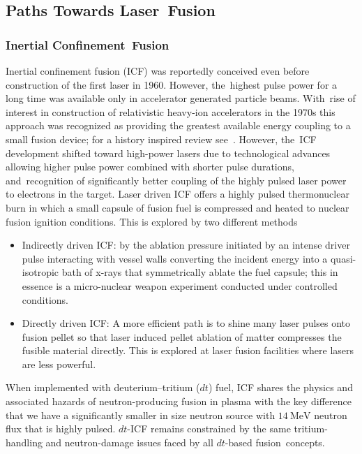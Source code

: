 \documentclass[particles,article,accept,pdftex,moreauthors]{Definitions/mdpi}
\newcommand*{\xblue}{}
\begin{document}
 
\subsection{Paths Towards Laser~Fusion}\label{ssec:INTlaserFusion}
\subsubsection{Inertial Confinement~Fusion}\label{sssec:picoICF}
Inertial confinement fusion (ICF) was {\xblue reportedly conceived even before construction of the first laser in 1960. However, the~highest pulse power for a long time was available only in accelerator generated particle beams. With~rise of interest in construction of relativistic heavy-ion accelerators in the 1970s this approach was recognized as providing the greatest available energy coupling to a small fusion device; for a history inspired review see~\cite{hofmann2018review}. However, the~ICF development shifted toward high-power lasers due to technological advances allowing higher pulse power combined with shorter pulse durations, and~recognition of significantly better coupling of the highly pulsed laser power to electrons in the target. Laser driven} ICF offers a highly pulsed thermonuclear burn in which a small capsule of fusion fuel is compressed and heated to nuclear fusion ignition conditions. This is explored by two different methods~\cite{Hurricane:2023Review}
\begin{itemize}
\item 
Indirectly driven ICF: by the ablation pressure initiated by an intense driver pulse interacting with vessel walls converting the incident energy into a quasi-isotropic bath of x-rays that symmetrically ablate the fuel capsule; this in essence is a micro-nuclear weapon experiment conducted under controlled conditions.
\item 
Directly driven ICF: A more efficient path is to shine many laser pulses onto fusion pellet so that laser induced pellet ablation of matter compresses the fusible material directly. This is explored at laser fusion facilities where lasers are less powerful.
\end{itemize}

When implemented with deuterium--tritium ($dt$) fuel, ICF shares the physics and associated hazards of neutron-producing fusion in plasma with the key difference that we have a significantly smaller in size neutron source with $14~\mathrm{MeV}$ neutron flux that is highly pulsed. $dt$-ICF remains constrained by the same tritium-handling and neutron-damage issues faced by all $dt$-based fusion~concepts. 
\end{document}
